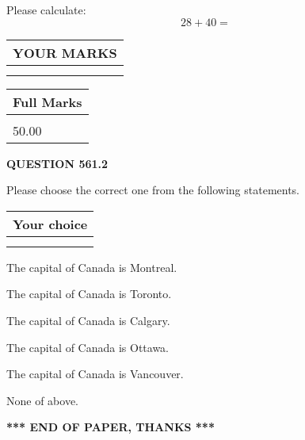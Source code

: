 \documentclass[12pt]{article}
\begin{document}
  
 
Please calculate:
\begin{equation}
28 +  %
40 = \nonumber
\end{equation}
 

 

 
  
\vspace{0.2in}
  
\noindent\begin{tabular}{|l|}
\hline
 YOUR MARKS  \\
\hline
 \\ 
 \\ 
\hline
\end{tabular}
\hspace{0.05in} \begin{tabular}{|l|}
\hline
 Full Marks  \\
\hline
 \\ 
50.00 \\
\hline
\end{tabular}
{\textbf{\Large{QUESTION
561.2 
}}}
  
  
Please choose the correct one from the following statements.
  
  
\noindent\hspace{3.0in} \begin{tabular}{|l|}
\hline
Your choice \\
\hline
 \\ 
 \\ 
\hline
\end{tabular}
  
  
 
 
The capital of Canada is Montreal.
 
 
The capital of Canada is Toronto.
 
 
The capital of Canada is Calgary.
 
 
The capital of Canada is Ottawa.
 
 
The capital of Canada is Vancouver.
 
 
 None of above.
 
 
   
   
 \vspace{0.2in}
 
   
   
   
   
\vspace{1.0in} 
{\textbf{\large{ *** END OF PAPER, THANKS *** }}} 
   
\end{document}

